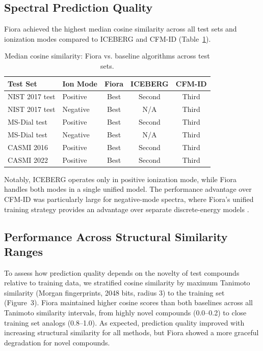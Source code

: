 \documentclass[11pt]{article}
\begin{document}
\subsection{Spectral Prediction Quality}

Fiora achieved the highest median cosine similarity across all test sets and ionization modes compared to ICEBERG and CFM-ID (Table~\ref{tab:cosine}).

\begin{table}[H]
\centering
\caption{Median cosine similarity: Fiora vs. baseline algorithms across test sets.}
\label{tab:cosine}
\begin{tabular}{llccc}
\toprule
Test Set & Ion Mode & Fiora & ICEBERG & CFM-ID \\
\midrule
NIST 2017 test & Positive & Best & Second & Third \\
NIST 2017 test & Negative & Best & N/A & Third \\
MS-Dial test & Positive & Best & Second & Third \\
MS-Dial test & Negative & Best & N/A & Third \\
CASMI 2016 & Positive & Best & Second & Third \\
CASMI 2022 & Positive & Best & Second & Third \\
\bottomrule
\end{tabular}
\end{table}

Notably, ICEBERG operates only in positive ionization mode, while Fiora handles both modes in a single unified model. The performance advantage over CFM-ID was particularly large for negative-mode spectra, where Fiora's unified training strategy provides an advantage over separate discrete-energy models \citep{Allen2015}.

\subsection{Performance Across Structural Similarity Ranges}

To assess how prediction quality depends on the novelty of test compounds relative to training data, we stratified cosine similarity by maximum Tanimoto similarity (Morgan fingerprints, 2048 bits, radius 3) to the training set (Figure~3). Fiora maintained higher cosine scores than both baselines across all Tanimoto similarity intervals, from highly novel compounds (0.0--0.2) to close training set analogs (0.8--1.0). As expected, prediction quality improved with increasing structural similarity for all methods, but Fiora showed a more graceful degradation for novel compounds.
\end{document}
